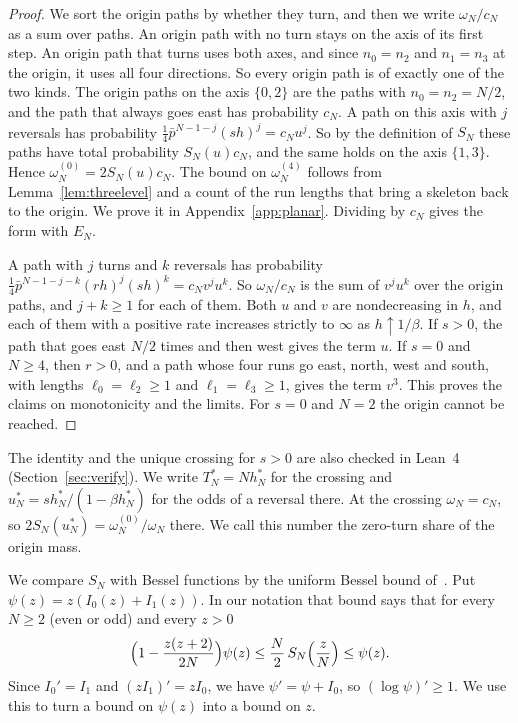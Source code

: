 \begin{proof}
We sort the origin paths by whether they turn, and then we write $\omega_N/c_N$ as a sum over paths.
An origin path with no turn stays on the axis of its first step. An origin path that turns uses both
axes, and since $n_0=n_2$ and $n_1=n_3$ at the origin, it uses all four directions. So every origin
path is of exactly one of the two kinds. The origin paths on the axis $\{0,2\}$ are the paths with
$n_0=n_2=N/2$, and the path that always goes east has probability $c_N$. A path on this axis
with $j$ reversals has probability $\frac14\bar p^{N-1-j}(sh)^j=c_Nu^j$. So by the definition of
$S_N$ these paths have total probability $S_N(u)c_N$, and the same holds on the axis $\{1,3\}$.
Hence $\omega^{(0)}_N=2S_N(u)c_N$. The bound on $\omega^{(4)}_N$ follows from Lemma~\ref{lem:threelevel} and a count
of the run lengths that bring a skeleton back to the origin. We prove it in
Appendix~\ref{app:planar}. Dividing by $c_N$ gives the form with $E_N$.

A path with $j$ turns and $k$ reversals has probability $\frac14\bar p^{N-1-j-k}(rh)^j(sh)^k=c_Nv^ju^k$.
So $\omega_N/c_N$ is the sum of $v^ju^k$ over the origin paths, and $j+k\ge1$ for each of them. Both $u$
and $v$ are nondecreasing in $h$, and each of them with a positive rate increases strictly to
$\infty$ as $h\uparrow1/\beta$. If $s>0$, the path that goes east $N/2$ times and then west gives
the term $u$. If $s=0$ and $N\ge4$, then $r>0$, and a path whose four runs go east, north, west and
south, with lengths $\ell_0=\ell_2\ge1$ and $\ell_1=\ell_3\ge1$, gives the term $v^3$. This proves
the claims on monotonicity and the limits. For $s=0$ and $N=2$ the origin cannot be reached.
\end{proof}

The identity and the unique crossing for $s>0$ are also checked in Lean~4 (Section~\ref{sec:verify}). We
write $T^*_N=Nh^*_N$ for the crossing and $u^*_N=sh^*_N/(1-\beta h^*_N)$ for the odds of a reversal
there. At the crossing $\omega_N=c_N$, so $2S_N(u^*_N)=\omega^{(0)}_N/\omega_N$ there. We call this number the
zero-turn share of the origin mass.

We compare $S_N$ with Bessel functions by the uniform Bessel bound
of~\cite[Theorem~3.3(i)]{paperA}. Put $\psi(z)=z(I_0(z)+I_1(z))$. In our notation that bound says
that for every $N\ge2$ (even or odd) and every $z>0$
\begin{equation}\label{eq:planar-bessel}
 \Bigl(1-\frac{z(z+2)}{2N}\Bigr)\psi(z)\le\frac N2\,S_N\Bigl(\frac zN\Bigr)\le\psi(z).
\end{equation}
Since $I_0'=I_1$ and $(zI_1)'=zI_0$, we have $\psi'=\psi+I_0$, so $(\log\psi)'\ge1$. We use this
to turn a bound on $\psi(z)$ into a bound on $z$.

